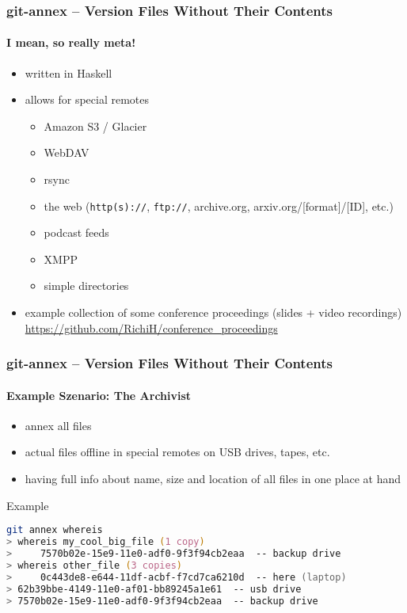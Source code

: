 \documentclass[english,hyperref={pdfpagelabels=false},aspectratio=169]{beamer}
\begin{document}
\begin{frame}
  \frametitle{git-annex -- Version Files Without Their Contents}
  \framesubtitle{I mean, so really meta!}
  \begin{itemize}
    \item written in Haskell
    \item allows for special remotes
      \begin{itemize}
        \item Amazon S3 / Glacier
        \item WebDAV
        \item rsync
        \item the web {\scriptsize\color{fzjgray50}(\texttt{http(s)://}, \texttt{ftp://}, archive.org, arxiv.org/[format]/[ID], etc.)}
        \item podcast feeds
        \item XMPP
        \item simple directories
      \end{itemize}
    \item example collection of some conference proceedings {\scriptsize\color{fzjgray50}(slides + video recordings)}\\
      {\scriptsize \url{https://github.com/RichiH/conference_proceedings}}
  \end{itemize}
\end{frame}


\begin{frame}[fragile]
  \frametitle{git-annex -- Version Files Without Their Contents}
  \framesubtitle{Example Szenario: The Archivist}
  \begin{itemize}
    \item annex all files
    \item actual files offline in special remotes on USB drives, tapes, etc.
    \item having full info about name, size and location of all files in one place at hand
  \end{itemize}
  
  \begin{block}{Example}
    \vspace{-0.75em}
    \begin{lstlisting}[language=zsh]
git annex whereis
> whereis my_cool_big_file (1 copy)
>     7570b02e-15e9-11e0-adf0-9f3f94cb2eaa  -- backup drive
> whereis other_file (3 copies)
>     0c443de8-e644-11df-acbf-f7cd7ca6210d  -- here (laptop)
> 62b39bbe-4149-11e0-af01-bb89245a1e61  -- usb drive
> 7570b02e-15e9-11e0-adf0-9f3f94cb2eaa  -- backup drive
    \end{lstlisting}
    \vspace{-0.75em}
  \end{block}
\end{frame}
\end{document}
